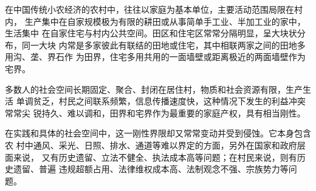 






  在中国传统小农经济的农村中，往往以家庭为基本单位，主要活动范围局限在村内，
  生产集中在自家规模极为有限的耕田或从事简单手工业、半加工业的家中，生活集中
  在自家住宅与村内公共空间。田区和住宅区常常分隔明显，呈大块状分布，同一大块
  内常是多家彼此有联结的田地或住宅，其中相联两家之间的田地多用沟、垄、界石作
  为田界，住宅多用共用的一面墙壁或距离极近的两面墙壁作为宅界。

  多数人的社会空间长期固定、聚合、封闭在居住村，物质和社会资源有限，生产生活
  单调贫乏，村民之间联系频繁，信息传播速度快，这种情况下发生的利益冲突常常尖
  锐持久、难以调和，田界和宅界作为最重要的家庭产权，具有相当刚性。

  在实践和具体的社会空间中，这一刚性界限却又常常变动并受到侵蚀。它本身包含农
  村中通风、采光、日照、排水、通道等难以界定的方面，另外在国家和政府层面来说，
  又有历史遗留、立法不健全、执法成本高等问题；在村民来说，则有历史遗留、普遍
  违规超额占用、法律维权成本高、法制观念不强、宗族势力等问题。


